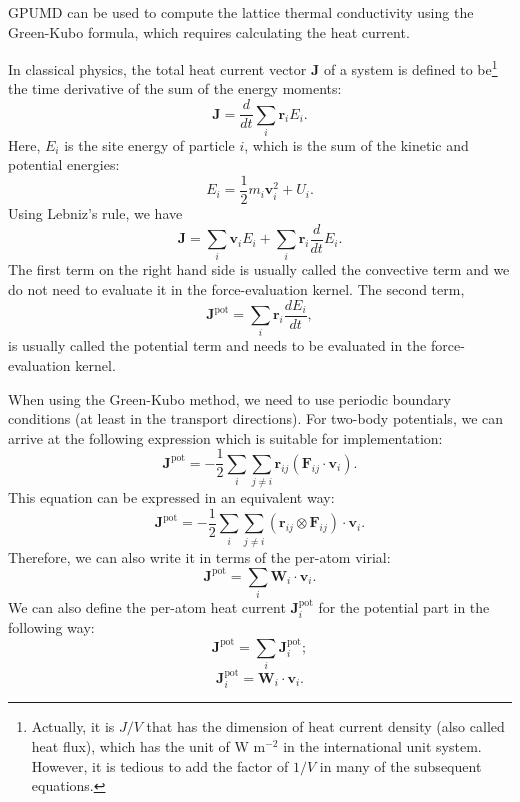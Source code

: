 \documentclass[12pt,a4paper]{report}
\newcommand{\vect}[1]{\boldsymbol{#1}}
\begin{document}
GPUMD can be used to compute the lattice thermal conductivity using the Green-Kubo \cite{green1954jcp,kubo1957jpsj} formula, which requires calculating the heat current.

In classical physics, the total heat current vector $\vect{J}$ of a system is defined to be\footnote{Actually, it is $J/V$ that has the dimension of heat current density (also called heat flux), which has the unit of W m$^{-2}$ in the international unit system. However, it is tedious to add the factor of $1/V$ in many of the subsequent equations.} the time derivative of the sum of the energy moments:
\begin{equation}
\vect{J} = \frac{d}{dt} \sum_i \vect{r}_i E_i.
\end{equation}
Here, $E_i$ is the site energy of particle $i$, which is the sum of the kinetic and potential energies:
\begin{equation}
E_i = \frac{1}{2}m_i \vect{v}_i^2 + U_i.
\end{equation}
Using Lebniz's rule, we have
\begin{equation}
\vect{J} = \sum_i \vect{v}_i E_i +  \sum_i \vect{r}_i \frac{d}{dt} E_i.
\end{equation}
The first term on the right hand side is usually called the convective term and we do not need to evaluate it in the force-evaluation kernel. The second term,
\begin{equation}
\vect{J}^{\text{pot}} = \sum_i \vect{r}_i \frac{d E_i} {dt},
\end{equation}
is usually called the potential term and needs to be evaluated in the force-evaluation kernel.

When using the Green-Kubo method, we need to use periodic boundary conditions (at least in the transport directions). For two-body potentials, we can arrive at the following expression which is suitable for implementation:
\begin{equation}
\vect{J}^{\text{pot}} = -\frac{1}{2} \sum_i \sum_{j \neq i}
\vect{r}_{ij}  \left( \vect{F}_{ij} \cdot \vect{v}_i \right).
\end{equation}
This equation can be expressed in an equivalent way:
\begin{equation}
\vect{J}^{\text{pot}} = -\frac{1}{2} \sum_i \sum_{j \neq i}
\left( \vect{r}_{ij} \otimes  \vect{F}_{ij} \right) \cdot \vect{v}_i .
\end{equation}
Therefore, we can also write it in terms of the per-atom virial:
\begin{equation}
\vect{J}^{\text{pot}} = \sum_i \textbf{W}_i \cdot \vect{v}_i.
\end{equation}
We can also define the per-atom heat current $\vect{J}_i^{\text{pot}}$ for the potential part in the following way:
\begin{equation}
\vect{J}^{\text{pot}} = \sum_i \vect{J}^{\text{pot}}_i;
\end{equation}
\begin{equation}
\vect{J}^{\text{pot}}_i = \textbf{W}_i \cdot \vect{v}_i.
\end{equation}
\end{document}
